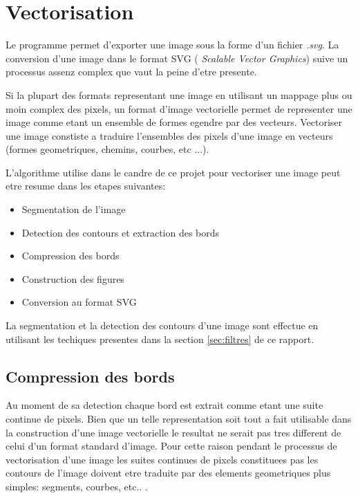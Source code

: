 \documentclass[twoside,openright,a4paper,11pt,french]{article}
\begin{document}
\newpage

\section{Vectorisation} 
Le programme permet d'exporter une image sous la forme d'un fichier
{\it .svg}. La conversion d'une image dans le format SVG ({\it
Scalable Vector Graphics}) suive un processus assenz complex que vaut
la peine d'etre presente.

Si la plupart des formats representant une image en utilisant un 
mappage plus ou moin complex des pixels, un format d'image vectorielle
permet de representer une image comme etant un ensemble de formes
egendre par des vecteurs. Vectoriser une image constiste a traduire
l'ensembles des pixels d'une image en vecteurs (formes geometriques,
chemins, courbes, etc ...).

L'algorithme utilise dans le candre de ce projet pour vectoriser une
image peut etre resume dans les etapes suivantes:   

\smallbreak
\begin{itemize}
\item Segmentation de l'image
\item Detection des contours et extraction des bords
\item Compression des bords
\item Construction des figures
\item Conversion au format SVG
\end{itemize}   
\bigbreak

La segmentation et la detection des contours d'une image sont effectue
en utilisant les techiques presentes dans la section
\ref{sec:filtres} de ce rapport.


\subsection{Compression des bords}
Au moment de sa detection chaque bord est extrait comme etant une
suite continue de pixels. Bien que un telle representation soit tout a
fait utilisable dans la construction d'une image vectorielle le
resultat ne serait pas tres different de celui d'un format standard
d'image. Pour cette raison pendant le processus de vectorisation d'une
image les suites continues de pixels constituees pas les contours de
l'image doivent etre traduite par des elements geometriques plus
simples: segments, courbes, etc.. .  
\end{document}

